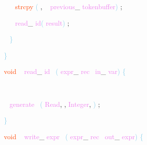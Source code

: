 \documentclass[8, usernames, dvipsnames]{beamer}
\begin{document}
\begin{frame}
 \textcolor{White}{\   }
\textcolor{White}{\   }
\textcolor{OrangeRed}{strcpy}
\textcolor{SkyBlue}{(}
\textcolor{Sepia}{,}
\textcolor{White}{\ }
\textcolor{Violet}{previous}\textcolor{Sepia}{\_}
\textcolor{Violet}{tokenbuffer}\textcolor{SkyBlue}{)}
\textcolor{Sepia}{;}

 \textcolor{White}{\   }
\textcolor{White}{\   }
\textcolor{Violet}{read}\textcolor{Sepia}{\_}
\textcolor{Violet}{id}\textcolor{SkyBlue}{(}
\textcolor{Violet}{result}\textcolor{SkyBlue}{)}
\textcolor{Sepia}{;}

 \end{frame}
\begin{frame}
\textcolor{White}{\   }
\textcolor{SkyBlue}{\} }

 \textcolor{SkyBlue}{\} }

 
 \textcolor{OrangeRed}{void}
\textcolor{White}{\ }
\textcolor{Violet}{read}\textcolor{Sepia}{\_}
\textcolor{Violet}{id}\textcolor{White}{\ }
\textcolor{SkyBlue}{(}
\textcolor{Violet}{expr}\textcolor{Sepia}{\_}
\textcolor{Violet}{rec}\textcolor{White}{\ }
\textcolor{Violet}{in}\textcolor{Sepia}{\_}
\textcolor{Violet}{var}\textcolor{SkyBlue}{)}
\textcolor{SkyBlue}{\{ }

 \textcolor{White}{\ }

 \textcolor{White}{\ }
\textcolor{Violet}{generate}\textcolor{White}{\ }
\textcolor{SkyBlue}{(}
\textcolor{Violet}{Read}\textcolor{Sepia}{,}
\textcolor{Sepia}{,}
\textcolor{Violet}{Integer}\textcolor{Sepia}{,}
\textcolor{SkyBlue}{)}
\textcolor{Sepia}{;}

 
 \textcolor{SkyBlue}{\} }

 \textcolor{OrangeRed}{void}
\textcolor{White}{\ }
\textcolor{Violet}{write}\textcolor{Sepia}{\_}
\textcolor{Violet}{expr}\textcolor{White}{\ }
\textcolor{SkyBlue}{(}
\textcolor{Violet}{expr}\textcolor{Sepia}{\_}
\textcolor{Violet}{rec}\textcolor{White}{\ }
\textcolor{Violet}{out}\textcolor{Sepia}{\_}
\textcolor{Violet}{expr}\textcolor{SkyBlue}{)}
\textcolor{SkyBlue}{\{ }

 
 \end{frame}
\end{document}
